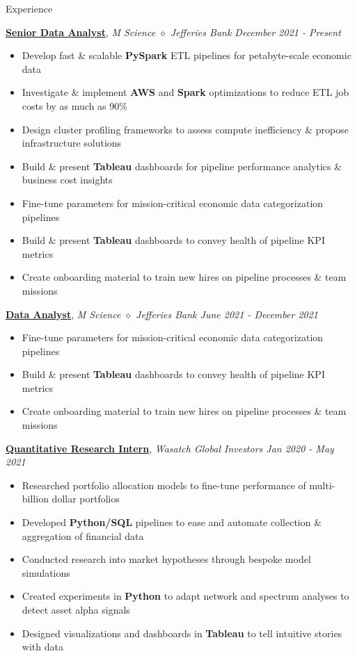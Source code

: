 \documentclass{resume/resume}
\begin{document}
\begin{rSection}{Experience}

    \href{https://mscience.com/}{\bf Senior Data Analyst}, {\em M Science $\diamond$ Jefferies Bank \hfill December 2021 - Present}
    \vspace{-6pt}
    \begin{itemize}[nosep]
        \item Develop fast \& scalable {\bf PySpark} ETL pipelines for petabyte-scale economic data
        \item Investigate \& implement {\bf AWS} and {\bf Spark} optimizations to reduce ETL job costs by as much as 90\%
        \item Design cluster profiling frameworks to assess compute inefficiency \& propose infrastructure solutions
        \item Build \& present {\bf Tableau} dashboards for pipeline performance analytics \& business cost insights
        \item Fine-tune parameters for mission-critical economic data categorization pipelines
        \item Build \& present {\bf Tableau} dashboards to convey health of pipeline KPI metrics
        \item Create onboarding material to train new hires on pipeline processes \& team missions
    \end{itemize}

    \href{https://mscience.com/}{\bf Data Analyst}, {\em M Science $\diamond$ Jefferies Bank \hfill June 2021 - December 2021}
    \vspace{-6pt}
    \begin{itemize}[nosep]
        \item Fine-tune parameters for mission-critical economic data categorization pipelines
        \item Build \& present {\bf Tableau} dashboards to convey health of pipeline KPI metrics
        \item Create onboarding material to train new hires on pipeline processes \& team missions
    \end{itemize}

    \href{https://wasatchglobal.com/}{\bf Quantitative Research Intern}, {\em Wasatch Global Investors \hfill Jan 2020 - May 2021}
    \vspace{-6pt}
    \begin{itemize}[nosep]
        \item Researched portfolio allocation models to fine-tune performance of multi-billion dollar portfolios
        \item Developed {\bf Python/SQL} pipelines to ease and automate collection \& aggregation of financial data
        \item Conducted research into market hypotheses through bespoke model simulations
        \item Created experiments in {\bf Python} to adapt network and spectrum analyses to detect asset alpha signals
         \item Designed visualizations and dashboards in {\bf Tableau} to tell intuitive stories with data
    \end{itemize}


\end{rSection}
\end{document}
